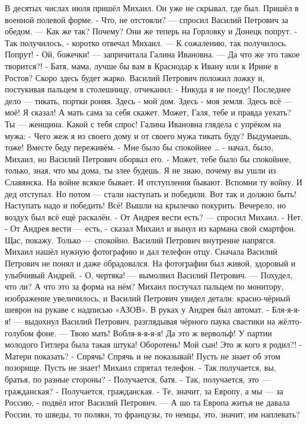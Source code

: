 В десятых числах июля пришёл Михаил. Он уже не скрывал, где был. Пришёл в военной полевой форме.
- Что, не отстояли? --- спросил Василий Петрович за обедом. --- Как же так? Почему? Они же теперь на Горловку и Донецк попрут.
- Так получилось, - коротко отвечал Михаил. --- К сожалению, так получилось. Попрут!
- Ой, божечки! --- запричитала Галина Ивановна. --- Да что же это такое творится?!
- Батя, мама, лучше бы вам в Краснодар к Ивану или к Ирине в Ростов? Скоро здесь будет жарко.
Василий Петрович положил ложку и, постукивая пальцем в столешницу, отчеканил:
- Никуда я не поеду! Последнее дело --- тикать, портки роняя. Здесь - мой дом. Здесь - моя земля. Здесь всё --- моё! Я сказал! А мать сама за себя скажет. Может, Галя, тебе и правда уехать? Ты --- женщина. Какой с тебя спрос!
Галина Ивановна глядела с упрёком на мужа:
- Чего жеж я из своего дому и от своего мужа тикать буду? Выдумаешь, тоже! Вместе беду переживём.
- Мне было бы спокойнее … - начал, было, Михаил, но Василий Петрович оборвал его.
- Может, тебе было бы спокойнее, только, зная, что мы дома, ты злее будешь. Я не знаю, почему вы ушли из Славянска. На войне всякое бывает. И отступления бывают. Вспомни ту войну. И дед отступал. Но потом --- стали наступать и победили. Вот так и должно быть! Наступать надо и победить! Всё!
Вышли на крылечко покурить. Вечерело, но воздух был всё ещё раскалён.
- От Андрея вести есть? --- спросил Михаил.
- Нет.
- От Андрея вести --- есть, - сказал Михаил и вынул из кармана свой смартфон. Щас, покажу. Только --- спокойно.
Василий Петрович внутренне напрягся. Михаил нашёл нужную фотографию и дал телефон отцу. Сначала Василий Петрович не понял и даже обрадовался. На фотографии был живой, здоровый и улыбчивый Андрей.
- О, чертяка! --- вымолвил Василий Петрович. --- Похудел, что ли? А что это за форма на нём?
Михаил постучал пальцем по монитору, изображение увеличилось, и Василий Петрович увидел детали: красно-чёрный шеврон на рукаве с надписью «АЗОВ». В руках у Андрея был автомат.
- Бля-я-я-я! --- выдохнул Василий Петрович, разглядывая чёрного паука свастики на жёлто-голубом фоне. --- Твою мать! Вобля-я-я-я-я! Да это ж вервольф! У партии молодого Гитлера была такая штука! Оборотень! Мой сын! Это ж кого я родил?!
- Матери показать?
- Спрячь! Спрячь и не показывай! Пусть не знает об этом позорище.  Пусть не знает!
Михаил спрятал телефон.
- Так получается, вы, братья, по разные стороны?
- Получается, батя.
- Так, получается, это --- гражданская?
- Получается, гражданская.
- Те, значит, за Европу, а мы --- за Россию, - подвёл итог Василий Петрович. --- А шо та Европа житья не давала России, то шведы, то поляки, то французы, то немцы, это, значит, им наплевать?
